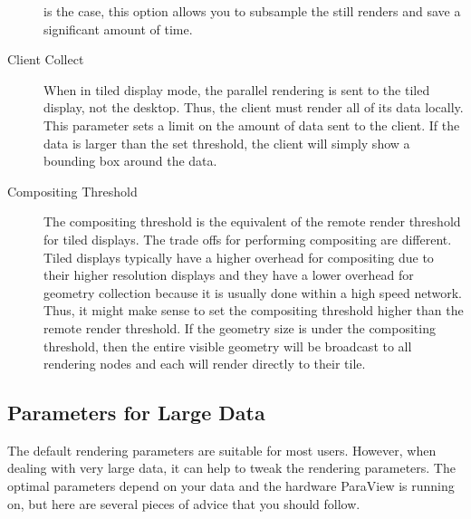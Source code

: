 \begin{description}
  is the case, this option allows you to subsample the still renders and
  save a significant amount of time.
\item[Client Collect]  When in tiled display mode,
  the parallel rendering is sent to the tiled display, not the desktop.
  Thus, the client must render all of its data locally.  This parameter
  sets a limit on the amount of data sent to the client.  If the data is
  larger than the set threshold, the client will simply show a bounding box
  around the data.
\item[Compositing Threshold]  The compositing
  threshold is the equivalent of the remote render threshold for tiled
  displays.  The trade offs for performing compositing are different.
  Tiled displays typically have a higher overhead for compositing due to
  their higher resolution displays and they have a lower overhead for
  geometry collection because it is usually done within a high speed
  network.  Thus, it might make sense to set the compositing threshold
  higher than the remote render threshold.  If the geometry size is under
  the compositing threshold, then the entire visible geometry will be
  broadcast to all rendering nodes and each will render directly to their
  tile.
\end{description}

\subsection{Parameters for Large Data}

The default rendering parameters are suitable for most users.  However,
when dealing with very large data, it can help to tweak the rendering
parameters.  The optimal parameters depend on your data and the hardware
ParaView is running on, but here are several pieces of advice that you
should follow.

